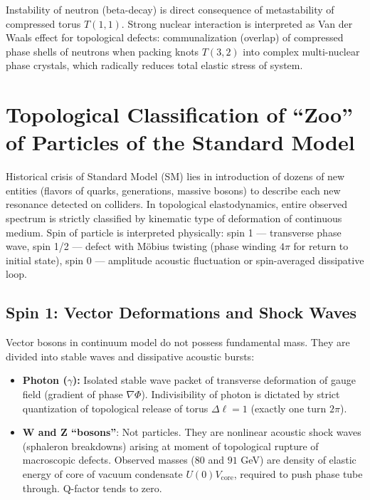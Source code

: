\documentclass[12pt,a4paper]{article}
\begin{document}
Instability of neutron (beta-decay) is direct consequence of metastability of compressed torus $T(1,1)$. Strong nuclear interaction is interpreted as Van der Waals effect for topological defects: communalization (overlap) of compressed phase shells of neutrons when packing knots $T(3,2)$ into complex multi-nuclear phase crystals, which radically reduces total elastic stress of system.

\section{Topological Classification of ``Zoo'' of Particles of the Standard Model}

Historical crisis of Standard Model (SM) lies in introduction of dozens of new entities (flavors of quarks, generations, massive bosons) to describe each new resonance detected on colliders. In topological elastodynamics, entire observed spectrum is strictly classified by kinematic type of deformation of continuous medium. Spin of particle is interpreted physically: spin 1 --- transverse phase wave, spin 1/2 --- defect with Möbius twisting (phase winding $4\pi$ for return to initial state), spin 0 --- amplitude acoustic fluctuation or spin-averaged dissipative loop.

\subsection{Spin 1: Vector Deformations and Shock Waves}
Vector bosons in continuum model do not possess fundamental mass. They are divided into stable waves and dissipative acoustic bursts:
\begin{itemize}
    \item \textbf{Photon ($\gamma$):} Isolated stable wave packet of transverse deformation of gauge field (gradient of phase $\nabla\Phi$). Indivisibility of photon is dictated by strict quantization of topological release of torus $\Delta\ell = 1$ (exactly one turn $2\pi$).
    \item \textbf{W and Z ``bosons''}: Not particles. They are nonlinear acoustic shock waves (sphaleron breakdowns) arising at moment of topological rupture of macroscopic defects. Observed masses ($80$ and $91$ GeV) are density of elastic energy of core of vacuum condensate $U(0)V_{\text{core}}$, required to push phase tube through. Q-factor tends to zero.
\end{itemize}
\end{document}
